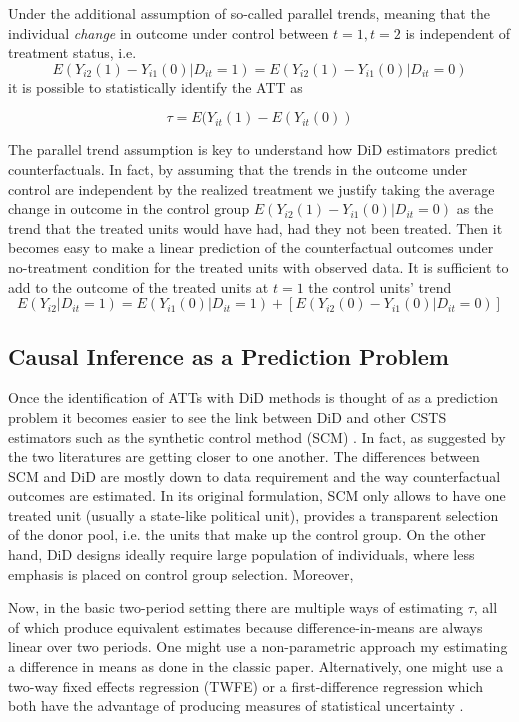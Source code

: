 \documentclass[hidelinks]{article}\usepackage[]{graphicx}\usepackage[]{color}
\begin{document}
Under the additional assumption of so-called parallel trends, meaning that the individual \textit{change} in outcome under control between $t = 1, t= 2$ is independent of treatment status, i.e.
$$ E(Y_{i2} (1) - Y_{i1}(0) | D_{it} = 1) = E(Y_{i2} (1) - Y_{i1}(0) | D_{it} = 0) $$
it is possible to statistically identify the ATT as

$$ \tau = E(Y_{it}(1) - E(Y_{it}(0))$$

The parallel trend assumption is key to understand how DiD estimators predict counterfactuals. In fact, by assuming that the trends in the outcome under control are independent by the realized treatment we justify taking the average change in outcome in the control group $E(Y_{i2} (1) - Y_{i1}(0) | D_{it} = 0)$ as the trend that the treated units would have had, had they not been treated. Then it becomes easy to make a linear prediction of the counterfactual outcomes under no-treatment condition for the treated units with observed data. It is sufficient to add to the outcome of the treated units at $t=1$ the control units' trend
$$ E(Y_{i2} | D_{it} = 1) = E(Y_{i1}(0) | D_{it} = 1) + \left[ E(Y_{i2} (0) - Y_{i1}(0) | D_{it} = 0) \right] $$

\subsection{Causal Inference as a Prediction Problem}

Once the identification of ATTs with DiD methods is thought of as a prediction problem it becomes easier to see the link between DiD and other CSTS estimators such as the synthetic control method (SCM) \parencite{Abadie2010}. In fact, as suggested by \textcite{Roth2022} the two literatures are getting closer to one another. The differences between SCM and DiD are mostly down to data requirement and the way counterfactual outcomes are estimated. In its original formulation, SCM only allows to have one treated unit (usually a state-like political unit), provides a transparent selection of the donor pool, i.e. the units that make up the control group. On the other hand, DiD designs ideally require large population of individuals, where less emphasis is placed on control group selection. Moreover,

Now, in the basic two-period setting there are multiple ways of estimating $\tau$, all of which produce equivalent estimates because difference-in-means are always linear over two periods. One might use a non-parametric approach my estimating a difference in means as done in the classic \textcite{Card1990} paper. Alternatively, one might use a two-way fixed effects regression (TWFE) or a first-difference regression which both have the advantage of producing measures of statistical uncertainty \parencite{Angrist2009}.
\end{document}
